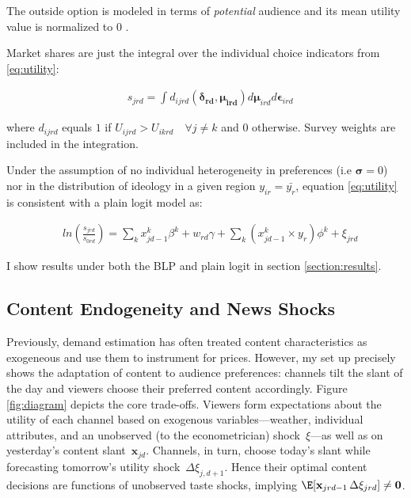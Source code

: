 \documentclass[12pt]{article}
\begin{document}
	The outside option is modeled in terms of \textit{potential} audience  \citep{berry1994estimating} and its mean utility value is normalized to 0 .
	
	Market shares are just the integral over the individual choice indicators from \ref{eq:utility}:  
	
	
	\begin{equation}\label{eq:shares}
	\begin{aligned}
		& s_{jrd} = \int d_{ijrd}(\bm{\delta_{rd}},\bm{\mu_{ird}})d\bm{\mu}_{ird}d\bm{\epsilon}_{ird}
	\end{aligned} 
\end{equation} 
	
	where $d_{ijrd}$ equals $1$ if $U_{ijrd}>U_{ikrd} \quad \forall j\neq k$ and $0$ otherwise. Survey weights are included in the integration. 

Under the assumption of no individual heterogeneity in preferences  (i.e $\bm{\sigma}=0$) nor in  the distribution of ideology in a given region $y_{ir}= \bar{y_r}$,  equation \ref{eq:utility} is consistent with a plain logit model as:


\begin{equation}\label{eq:logit}
	\begin{aligned}
		& ln \left(\frac{s_{jrd}}{s_{0rd}}\right)= \sum_k x_{jd-1}^k\beta^k+w_{rd}   \gamma  +\sum_k \left(x_{jd-1}^k\times y_r \right) \phi^k +  \xi_{jrd}
	\end{aligned} 
\end{equation} 


I show results under both the BLP and plain logit in  section \ref{section:results}. 
	
	\subsection{Content Endogeneity and News Shocks} \label{section:endogeneity}
	
	
Previously, demand estimation has often treated content characteristics as exogeneous and use them to instrument for prices. However, my set up precisely shows the adaptation of content to audience preferences: channels tilt the slant of the day and viewers choose their preferred content accordingly. 
	Figure \ref{fig:diagram} depicts the core trade-offs. Viewers form expectations about the utility of each channel based on exogenous variables—weather, individual attributes, and an unobserved (to the econometrician) shock~$\xi$—as well as on yesterday’s content slant~$\bm{x}_{jd}$.  
	Channels, in turn, choose today’s slant while forecasting tomorrow’s utility shock~$\Delta\xi_{j,d+1}$.  
	Hence their optimal content decisions are functions of unobserved taste shocks, implying $\E[\mathbf{x}_{jrd-1}\,\Delta\xi_{jrd}] \neq \mathbf{0}$.
	
\end{document}
